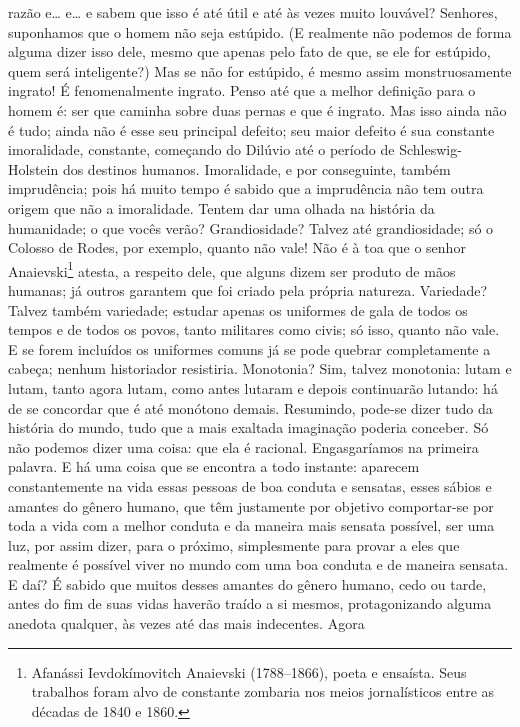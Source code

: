 razão e\ldots{} e\ldots{} e sabem que isso é até útil e até às vezes muito
louvável? Senhores, suponhamos que o homem não seja estúpido. (E realmente não
podemos de forma alguma dizer isso dele, mesmo que apenas pelo fato de que, se
ele for estúpido, quem será inteligente?) Mas se não for estúpido, é mesmo
assim monstruosamente ingrato! É fenomenalmente ingrato. Penso até que a melhor
definição para o homem é: ser que caminha sobre duas pernas e que é ingrato.
Mas isso ainda não é tudo; ainda não é esse seu principal defeito; seu maior
defeito é sua constante imoralidade, constante, começando do Dilúvio até o
período de Schleswig-Holstein dos destinos humanos. Imoralidade, e por
conseguinte, também imprudência; pois há muito tempo é sabido que a imprudência
não tem outra origem que não a imoralidade. Tentem dar uma olhada na história
da humanidade; o que vocês verão? Grandiosidade? Talvez até grandiosidade; só o
Colosso de Rodes, por exemplo, quanto não vale! Não é à toa que o senhor
Anaievski\footnote{ Afanássi Ievdokímovitch Anaievski (1788--1866), poeta e
ensaísta. Seus trabalhos foram alvo de constante zombaria nos meios
jornalísticos entre as décadas de 1840 e 1860.} atesta, a respeito dele, que
alguns dizem ser produto de mãos humanas; já outros garantem que foi criado pela
própria natureza. Variedade? Talvez também variedade; estudar apenas os
uniformes de gala de todos os tempos e de todos os povos, tanto militares como
civis; só isso, quanto não vale. E se forem incluídos os uniformes comuns já se
pode quebrar completamente a cabeça; nenhum historiador resistiria. Monotonia?
Sim, talvez monotonia: lutam e lutam, tanto agora lutam, como antes lutaram e
depois continuarão lutando: há de se concordar que é até monótono demais.
Resumindo, pode-se dizer tudo da história do mundo, tudo que a mais exaltada
imaginação poderia conceber. Só não podemos dizer uma coisa: que ela é
racional. Engasgaríamos na primeira palavra. E há uma coisa que se encontra a
todo instante: aparecem constantemente na vida essas pessoas de boa conduta e
sensatas, esses sábios e amantes do gênero humano, que têm justamente por
objetivo comportar-se por toda a vida com a melhor conduta e da maneira mais
sensata possível, ser uma luz, por assim dizer, para o próximo, simplesmente
para provar a eles que realmente é possível viver no mundo com uma boa conduta
e de maneira sensata. E daí? É sabido que muitos desses amantes do gênero
humano, cedo ou tarde, antes do fim de suas vidas haverão traído a si mesmos,
protagonizando alguma anedota qualquer, às vezes até das mais indecentes. Agora
